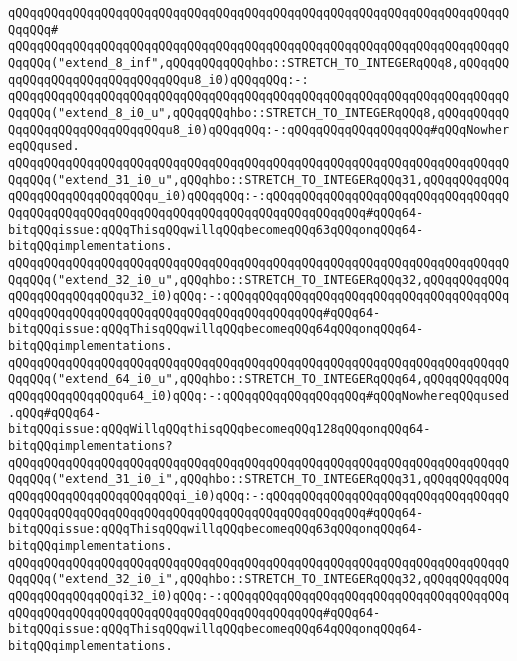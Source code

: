 \verb|qQQqqQQqqQQqqQQqqQQqqQQqqQQqqQQqqQQqqQQqqQQqqQQqqQQqqQQqqQQqqQQqqQQqqQQqqQQq#|\newline
\verb|qQQqqQQqqQQqqQQqqQQqqQQqqQQqqQQqqQQqqQQqqQQqqQQqqQQqqQQqqQQqqQQqqQQqqQQqqQQq("extend_8_inf",qQQqqQQqqQQqhbo::STRETCH_TO_INTEGERqQQq8,qQQqqQQqqQQqqQQqqQQqqQQqqQQqqQQqu8_i0)qQQqqQQq:-:|\newline
\verb|qQQqqQQqqQQqqQQqqQQqqQQqqQQqqQQqqQQqqQQqqQQqqQQqqQQqqQQqqQQqqQQqqQQqqQQqqQQq("extend_8_i0_u",qQQqqQQqhbo::STRETCH_TO_INTEGERqQQq8,qQQqqQQqqQQqqQQqqQQqqQQqqQQqqQQqu8_i0)qQQqqQQq:-:qQQqqQQqqQQqqQQqqQQq#qQQqNowhereqQQqused.|\newline
\verb|qQQqqQQqqQQqqQQqqQQqqQQqqQQqqQQqqQQqqQQqqQQqqQQqqQQqqQQqqQQqqQQqqQQqqQQqqQQq("extend_31_i0_u",qQQqhbo::STRETCH_TO_INTEGERqQQq31,qQQqqQQqqQQqqQQqqQQqqQQqqQQqqQQqu_i0)qQQqqQQq:-:qQQqqQQqqQQqqQQqqQQqqQQqqQQqqQQqqQQqqQQqqQQqqQQqqQQqqQQqqQQqqQQqqQQqqQQqqQQqqQQqqQQq#qQQq64-bitqQQqissue:qQQqThisqQQqwillqQQqbecomeqQQq63qQQqonqQQq64-bitqQQqimplementations.|\newline
\verb|qQQqqQQqqQQqqQQqqQQqqQQqqQQqqQQqqQQqqQQqqQQqqQQqqQQqqQQqqQQqqQQqqQQqqQQqqQQq("extend_32_i0_u",qQQqhbo::STRETCH_TO_INTEGERqQQq32,qQQqqQQqqQQqqQQqqQQqqQQqqQQqu32_i0)qQQq:-:qQQqqQQqqQQqqQQqqQQqqQQqqQQqqQQqqQQqqQQqqQQqqQQqqQQqqQQqqQQqqQQqqQQqqQQqqQQqqQQqqQQq#qQQq64-bitqQQqissue:qQQqThisqQQqwillqQQqbecomeqQQq64qQQqonqQQq64-bitqQQqimplementations.|\newline
\verb|qQQqqQQqqQQqqQQqqQQqqQQqqQQqqQQqqQQqqQQqqQQqqQQqqQQqqQQqqQQqqQQqqQQqqQQqqQQq("extend_64_i0_u",qQQqhbo::STRETCH_TO_INTEGERqQQq64,qQQqqQQqqQQqqQQqqQQqqQQqqQQqu64_i0)qQQq:-:qQQqqQQqqQQqqQQqqQQq#qQQqNowhereqQQqused.qQQq#qQQq64-bitqQQqissue:qQQqWillqQQqthisqQQqbecomeqQQq128qQQqonqQQq64-bitqQQqimplementations?|\newline
\verb|qQQqqQQqqQQqqQQqqQQqqQQqqQQqqQQqqQQqqQQqqQQqqQQqqQQqqQQqqQQqqQQqqQQqqQQqqQQq("extend_31_i0_i",qQQqhbo::STRETCH_TO_INTEGERqQQq31,qQQqqQQqqQQqqQQqqQQqqQQqqQQqqQQqqQQqi_i0)qQQq:-:qQQqqQQqqQQqqQQqqQQqqQQqqQQqqQQqqQQqqQQqqQQqqQQqqQQqqQQqqQQqqQQqqQQqqQQqqQQqqQQqqQQq#qQQq64-bitqQQqissue:qQQqThisqQQqwillqQQqbecomeqQQq63qQQqonqQQq64-bitqQQqimplementations.|\newline
\verb|qQQqqQQqqQQqqQQqqQQqqQQqqQQqqQQqqQQqqQQqqQQqqQQqqQQqqQQqqQQqqQQqqQQqqQQqqQQq("extend_32_i0_i",qQQqhbo::STRETCH_TO_INTEGERqQQq32,qQQqqQQqqQQqqQQqqQQqqQQqqQQqi32_i0)qQQq:-:qQQqqQQqqQQqqQQqqQQqqQQqqQQqqQQqqQQqqQQqqQQqqQQqqQQqqQQqqQQqqQQqqQQqqQQqqQQqqQQqqQQq#qQQq64-bitqQQqissue:qQQqThisqQQqwillqQQqbecomeqQQq64qQQqonqQQq64-bitqQQqimplementations.|\newline
